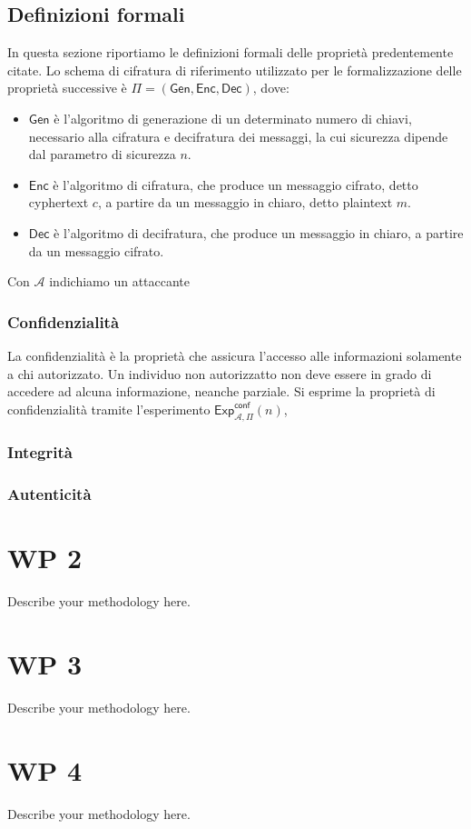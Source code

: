 \documentclass[a4paper,12pt]{article}
\begin{document}
\subsection{Definizioni formali}
In questa sezione riportiamo le definizioni formali delle proprietà predentemente citate. 
\newline 
Lo schema di cifratura di riferimento utilizzato per le formalizzazione delle proprietà successive è $\Pi =\mathsf{(Gen,Enc,Dec)}$, dove: 
\begin{itemize}
    \item $\mathsf{Gen}$ è l'algoritmo di generazione di un determinato numero di chiavi, necessario alla cifratura e decifratura dei messaggi, la cui sicurezza dipende dal parametro di sicurezza $n$.
    \item $\mathsf{Enc}$ è l'algoritmo di cifratura, che produce un messaggio cifrato, detto cyphertext $c$, a partire da un messaggio in chiaro, detto plaintext $m$.
    \item $\mathsf{Dec}$ è l'algoritmo di decifratura, che produce un messaggio in chiaro, a partire da un messaggio cifrato.
\end{itemize}
Con $\mathcal{A}$ indichiamo un attaccante 

\subsubsection {Confidenzialità}
La confidenzialità è la proprietà che assicura l'accesso alle informazioni solamente a chi autorizzato. Un individuo non autorizzatto non deve essere in grado di accedere ad alcuna informazione, neanche parziale. 
\newline Si esprime la proprietà di confidenzialità tramite l'esperimento $\mathsf{Exp}_{\mathcal A,\Pi}^\mathsf{conf}(n)$,



\subsubsection {Integrità}

\subsubsection {Autenticità}

\newpage
\section{WP 2}
Describe your methodology here.
\newpage
\section{WP 3}
Describe your methodology here.
\newpage
\section{WP 4}
Describe your methodology here.
\end{document}
